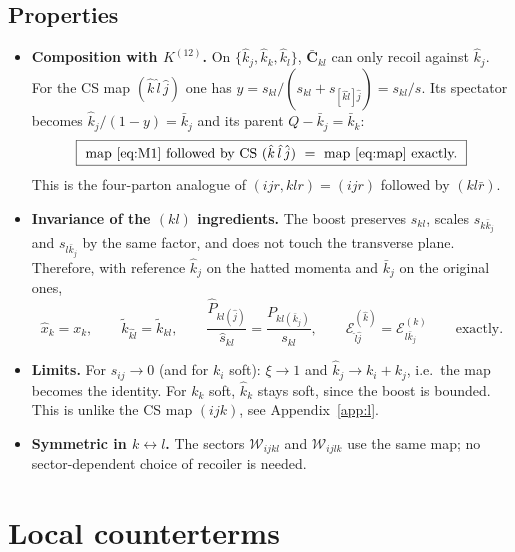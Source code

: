 \documentclass[11pt,a4paper]{article}
\newcommand{\W}[1]{\mathcal W_{#1}}
\newcommand{\jb}{\bar k_{j}}
\newcommand{\kb}{\bar k_{k}}
\newcommand{\jh}{\hat k_{j}}
\newcommand{\kh}{\hat k_{k}}
\newcommand{\lh}{\hat k_{l}}
\newcommand{\E}[3]{\mathcal E^{(#1)}_{#2#3}}
\begin{document}
\subsection{Properties}
\begin{itemize}
\item \textbf{Composition with $K^{(12)}$.} On $\{\jh,\kh,\lh\}$, $\bar{\mathbf C}_{kl}$ can only
recoil against $\jh$. For the CS map $(\hat k\,\hat l\,\hat j)$ one has
$y=s_{kl}/(s_{kl}+s_{[\hat k\hat l]\hat j})=s_{kl}/s$. Its spectator becomes
$\jh/(1-y)=\jb$ and its parent $Q-\jb=\kb$:
\begin{equation}
\boxed{\ \text{map }\eqref{eq:M1}\ \text{followed by CS }(\hat k\,\hat l\,\hat j)\ =\ \text{map }\eqref{eq:map}\ \text{exactly.}\ }
\end{equation}
This is the four-parton analogue of $(ijr,klr)=(ijr)$ followed by $(kl\bar r)$.
\item \textbf{Invariance of the $(kl)$ ingredients.} The boost preserves $s_{kl}$, scales
$s_{k\jb}$ and $s_{l\jb}$ by the same factor, and does not touch the transverse plane. Therefore, with
reference $\jh$ on the hatted momenta and $\jb$ on the original ones,
\begin{equation}
\hat x_k=x_k,\qquad \tilde k_{\hat k\hat l}=\tilde k_{kl},\qquad
\frac{\hat P_{kl(\hat j)}}{\hat s_{kl}}=\frac{P_{kl(\jb)}}{s_{kl}},\qquad
\mathcal E^{(\hat k)}_{\hat l\hat j}=\E{k}{l}{\jb}
\qquad\text{exactly.}
\end{equation}
\item \textbf{Limits.} For $s_{ij}\to0$ (and for $k_i$ soft): $\xi\to1$ and $\jh\to k_i+k_j$, i.e.\ the map
becomes the identity. For $k_k$ soft, $\kh$ stays soft, since the boost is bounded.
This is unlike the CS map $(ijk)$, see Appendix~\ref{app:l}.
\item \textbf{Symmetric in $k\leftrightarrow l$.} The sectors $\W{ijkl}$ and $\W{ijlk}$ use the same map;
no sector-dependent choice of recoiler is needed.
\end{itemize}

\section{Local counterterms}
\label{sec:local}
\end{document}
